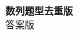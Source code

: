 \documentclass[zihao=-4]{exam-zh}
\begin{document}
\begin{center}
  {\bfseries 数列题型去重版}\\[4pt]
  { 答案版}
\end{center}

\end{document}
